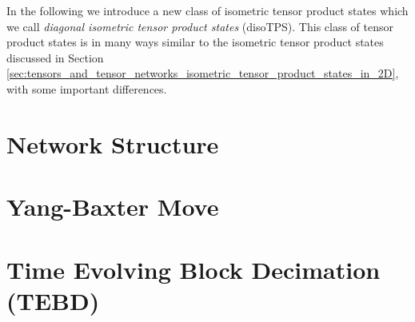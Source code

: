 In the following we introduce a new class of isometric tensor product states which we call \textit{diagonal isometric tensor product states} (disoTPS). This class of tensor product states is in many ways similar to the isometric tensor product states discussed in Section \ref{sec:tensors_and_tensor_networks_isometric_tensor_product_states_in_2D}, with some important differences. 

\section{Network Structure}
\label{sec:disoTPS_network_structure}


\section{Yang-Baxter Move}
\label{sec:disoTPS_yang_baxter_move}


\section{Time Evolving Block Decimation (TEBD)}
\label{sec:disoTPS_TEBD}

